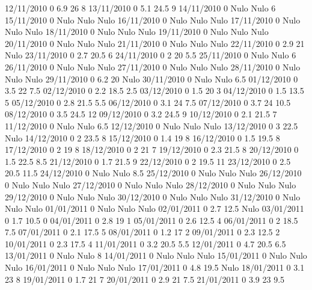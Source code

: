 12/11/2010  0      6.9    26     8 
13/11/2010  0      5.1    24.5   9 
14/11/2010  0     Nulo   Nulo    6 
15/11/2010  0     Nulo   Nulo   Nulo
16/11/2010  0     Nulo   Nulo   Nulo
17/11/2010  0     Nulo   Nulo   Nulo
18/11/2010  0     Nulo   Nulo   Nulo
19/11/2010  0     Nulo   Nulo   Nulo
20/11/2010  0     Nulo   Nulo   Nulo
21/11/2010  0     Nulo   Nulo   Nulo
22/11/2010  0      2.9    21    Nulo
23/11/2010  0      2.7    20.5   6 
24/11/2010  0      2      20     5.5 
25/11/2010  0     Nulo   Nulo    6 
26/11/2010  0     Nulo   Nulo   Nulo
27/11/2010  0     Nulo   Nulo   Nulo
28/11/2010  0     Nulo   Nulo   Nulo
29/11/2010  0      6.2    20    Nulo
30/11/2010  0     Nulo   Nulo    6.5 
01/12/2010  0      3.5    22     7.5 
02/12/2010  0      2.2    18.5   2.5 
03/12/2010  0      1.5    20     3 
04/12/2010  0      1.5    13.5   5 
05/12/2010  0      2.8    21.5   5.5 
06/12/2010  0      3.1    24     7.5 
07/12/2010  0      3.7    24     10.5 
08/12/2010  0      3.5    24.5   12 
09/12/2010  0      3.2    24.5   9 
10/12/2010  0      2.1    21.5   7 
11/12/2010  0     Nulo   Nulo    6.5 
12/12/2010  0     Nulo   Nulo   Nulo
13/12/2010  0      3      22.5  Nulo
14/12/2010  0      2      23.5   8 
15/12/2010  0      1.4    19     8 
16/12/2010  0      1.5    19.5   8 
17/12/2010  0      2      19     8 
18/12/2010  0      2      21     7 
19/12/2010  0      2.3    21.5   8 
20/12/2010  0      1.5    22.5   8.5 
21/12/2010  0      1.7    21.5   9 
22/12/2010  0      2      19.5   11 
23/12/2010  0      2.5    20.5   11.5 
24/12/2010  0     Nulo   Nulo    8.5 
25/12/2010  0     Nulo   Nulo   Nulo
26/12/2010  0     Nulo   Nulo   Nulo
27/12/2010  0     Nulo   Nulo   Nulo
28/12/2010  0     Nulo   Nulo   Nulo
29/12/2010  0     Nulo   Nulo   Nulo
30/12/2010  0     Nulo   Nulo   Nulo
31/12/2010  0     Nulo   Nulo   Nulo
01/01/2011  0     Nulo   Nulo   Nulo
02/01/2011  0      2.7    12.5  Nulo
03/01/2011  0      1.7    10.5   0 
04/01/2011  0      2.8    19     1 
05/01/2011  0      2.6    12.5   4 
06/01/2011  0      2      18.5   7.5 
07/01/2011  0      2.1    17.5   5 
08/01/2011  0      1.2    17     2 
09/01/2011  0      2.3    12.5   2 
10/01/2011  0      2.3    17.5   4 
11/01/2011  0      3.2    20.5   5.5 
12/01/2011  0      4.7    20.5   6.5 
13/01/2011  0     Nulo   Nulo    8 
14/01/2011  0     Nulo   Nulo   Nulo
15/01/2011  0     Nulo   Nulo   Nulo
16/01/2011  0     Nulo   Nulo   Nulo
17/01/2011  0      4.8    19.5  Nulo
18/01/2011  0      3.1    23     8 
19/01/2011  0      1.7    21     7 
20/01/2011  0      2.9    21     7.5 
21/01/2011  0      3.9    23     9.5 
